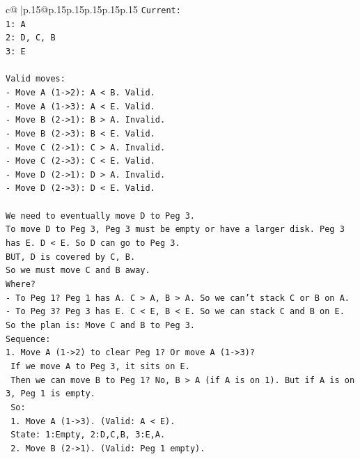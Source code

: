\documentclass{article}
\begin{document}
{\begin{supertabular}{c@{$\;$}|p{.15\linewidth}@{}p{.15\linewidth}p{.15\linewidth}p{.15\linewidth}p{.15\linewidth}p{.15\linewidth}}
{{{\texttt{Current:} \\
\texttt{1: A} \\
\texttt{2: D, C, B} \\
\texttt{3: E} \\
\\ 
\texttt{Valid moves:} \\
\texttt{{-} Move A (1{-}>2): A < B. Valid.} \\
\texttt{{-} Move A (1{-}>3): A < E. Valid.} \\
\texttt{{-} Move B (2{-}>1): B > A. Invalid.} \\
\texttt{{-} Move B (2{-}>3): B < E. Valid.} \\
\texttt{{-} Move C (2{-}>1): C > A. Invalid.} \\
\texttt{{-} Move C (2{-}>3): C < E. Valid.} \\
\texttt{{-} Move D (2{-}>1): D > A. Invalid.} \\
\texttt{{-} Move D (2{-}>3): D < E. Valid.} \\
\\ 
\texttt{We need to eventually move D to Peg 3.} \\
\texttt{To move D to Peg 3, Peg 3 must be empty or have a larger disk. Peg 3 has E. D < E. So D can go to Peg 3.} \\
\texttt{BUT, D is covered by C, B.} \\
\texttt{So we must move C and B away.} \\
\texttt{Where?} \\
\texttt{{-} To Peg 1? Peg 1 has A. C > A, B > A. So we can't stack C or B on A.} \\
\texttt{{-} To Peg 3? Peg 3 has E. C < E, B < E. So we can stack C and B on E.} \\
\texttt{So the plan is: Move C and B to Peg 3.} \\
\texttt{Sequence:} \\
\texttt{1. Move A (1{-}>2) to clear Peg 1? Or move A (1{-}>3)?} \\
\texttt{   If we move A to Peg 3, it sits on E.} \\
\texttt{   Then we can move B to Peg 1? No, B > A (if A is on 1). But if A is on 3, Peg 1 is empty.} \\
\texttt{   So:} \\
\texttt{   1. Move A (1{-}>3). (Valid: A < E).} \\
\texttt{      State: 1:Empty, 2:D,C,B, 3:E,A.} \\
\texttt{   2. Move B (2{-}>1). (Valid: Peg 1 empty).} \\
}}}
\end{supertabular}}
\end{document}
